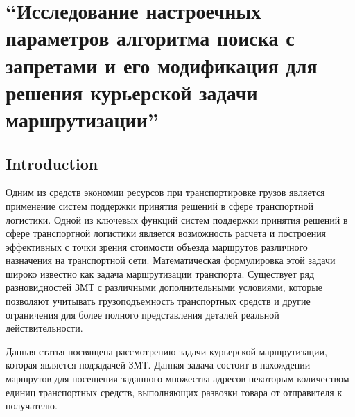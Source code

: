 \documentclass[]{TAACpaper}
\begin{document}

\def\dd#1#2{\frac{\partial#1}{\partial#2}}
\section{
``Исследование  настроечных параметров алгоритма поиска с запретами и его модификация для решения курьерской задачи маршрутизации'' 
}



\subsection{Introduction}
Одним из средств экономии ресурсов при транспортировке грузов является применение систем поддержки принятия решений в сфере транспортной логистики. Одной из ключевых функций систем поддержки принятия решений в сфере транспортной логистики является возможность расчета и построения эффективных с точки зрения стоимости объезда маршрутов различного назначения на транспортной сети. Математическая формулировка этой задачи широко известно как задача маршрутизации транспорта. Существует ряд разновидностей ЗМТ с различными дополнительными условиями, которые позволяют учитывать грузоподъемность транспортных средств и другие ограничения для более полного представления деталей реальной действительности.

Данная статья посвящена рассмотрению задачи курьерской маршрутизации, которая является подзадачей ЗМТ. Данная задача состоит в нахождении маршрутов для посещения заданного множества адресов некоторым количеством единиц транспортных средств, выполняющих развозки товара от отправителя к получателю. 
\end{document}
